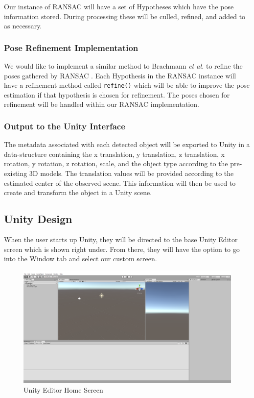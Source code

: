 \documentclass[12pt]{article}
\begin{document}
Our instance of RANSAC will have a set of Hypotheses which have the pose
information stored. During processing these will be culled, refined, and
added to as necessary.

\subsubsection{Pose Refinement
Implementation}\label{pose-refinement-implementation}

We would like to implement a similar method to Brachmann \emph{et al.}
to refine the poses gathered by RANSAC \autocite{brachmann}. Each
Hypothesis in the RANSAC instance will have a refinement method called
\texttt{refine()} which will be able to improve the pose estimation if
that hypothesis is chosen for refinement. The poses chosen for
refinement will be handled within our RANSAC implementation.

\subsubsection{Output to the Unity
Interface}\label{output-to-the-unity-interface}

The metadata associated with each detected object will be exported to
Unity in a data-structure containing the x translation, y translation, z
translation, x rotation, y rotation, z rotation, scale, and the object
type according to the pre-existing 3D models. The translation values
will be provided according to the estimated center of the observed
scene. This information will then be used to create and transform the
object in a Unity scene.

\subsection{Unity Design}\label{unity-design}

When the user starts up Unity, they will be directed to the base Unity
Editor screen which is shown right under. From there, they will have the
option to go into the Window tab and select our custom screen.

\begin{figure}
\centering
\includegraphics{Pictures/UnityHomeScreen.png}
\caption{Unity Editor Home Screen}
\end{figure}
\end{document}
